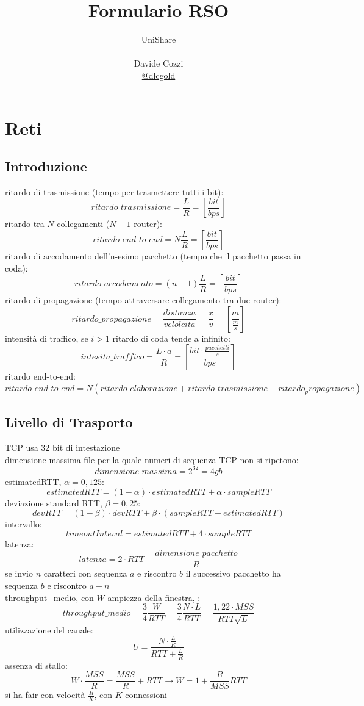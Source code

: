 \documentclass[a4paper,12pt, oneside]{book}
\title{Formulario RSO}
\author{UniShare\\\\Davide Cozzi\\\href{https://t.me/dlcgold}{@dlcgold}}
\date{}
\begin{document}
\maketitle


\newtheorem{teorema}{Teorema}
\newtheorem{definizione}{Definizione}
\newtheorem{esempio}{Esempio}
\newtheorem{corollario}{Corollario}
\newtheorem{lemma}{Lemma}
\newtheorem{osservazione}{Osservazione}
\newtheorem{nota}{Nota}
\newtheorem{esercizio}{Esercizio}
\tableofcontents

\renewcommand{\chaptermark}[1]{%
\markboth{\chaptername
\ \thechapter.\ #1}{}}
\renewcommand{\sectionmark}[1]{\markright{\thesection.\ #1}}
\chapter{Reti}
\section{Introduzione}
ritardo di trasmissione  (tempo per trasmettere tutti i bit):
$$ritardo\_trasmissione=\frac{L}{R}=\left[\frac{bit}{bps}\right]$$
ritardo tra $N$ collegamenti ($N-1$ router):
$$ritardo\_end\_to\_end=N\frac{L}{R}=\left[\frac{bit}{bps}\right]$$
ritardo di accodamento dell'n-esimo pacchetto (tempo che il pacchetto passa in coda):
$$ritardo\_accodamento=(n-1)\frac{L}{R}=\left[\frac{bit}{bps}\right]$$
ritardo di propagazione (tempo attraversare collegamento tra due router):
$$ritardo\_propagazione=\frac{distanza}{velolcita}=\frac{x}{v}=\left[\frac{m}{\frac{m}{s}}\right]$$
intensità di traffico, se $i>1$ ritardo di coda tende a infinito:
$$intesita\_traffico=\frac{L\cdot a}{R}=\left[\frac{bit\cdot \frac{pacchetti}{s}}{bps}\right]$$
ritardo end-to-end:
$$ritardo\_end\_to\_end=N(ritardo\_elaborazione+ritardo\_trasmissione+ritardo_propagazione)$$
\section{Livello di Trasporto}
TCP usa 32 bit di intestazione\\
dimensione massima file per la quale numeri di sequenza TCP non si ripetono:
$$dimensione\_massima=2^{32}=4gb$$
estimatedRTT, $\alpha=0,125$:
$$estimatedRTT=(1-\alpha)\cdot estimatedRTT+\alpha\cdot sampleRTT$$
deviazione standard RTT, $\beta=0,25$:
$$devRTT=(1-\beta)\cdot devRTT+\beta\cdot (sampleRTT-estimatedRTT)$$
intervallo:
$$timeoutInteval=estimatedRTT+4\cdot sampleRTT$$
latenza:
$$latenza=2\cdot RTT+\frac{dimensione\_pacchetto}{R}$$
se invio $n$ caratteri con sequenza $a$ e riscontro $b$ il successivo pacchetto ha sequenza $b$ e riscontro $a+n$\\
throughput\_medio, con $W$ ampiezza della finestra, :
$$throughput\_medio=\frac{3}{4}\frac{W}{RTT}=\frac{3}{4}\frac{N\cdot L}{RTT}=\frac{1,22\cdot MSS}{RTT\sqrt{L}}$$
utilizzazione del canale:
$$U=\frac{N\cdot \frac{L}{R}}{RTT+\frac{L}{R}}$$
assenza di stallo:
$$W\cdot \frac{MSS}{R}=\frac{MSS}{R}+RTT\to W=1+\frac{R}{MSS}RTT$$
si ha fair con velocità $\frac{R}{K}$, con $K$ connessioni
\newpage
\end{document}
